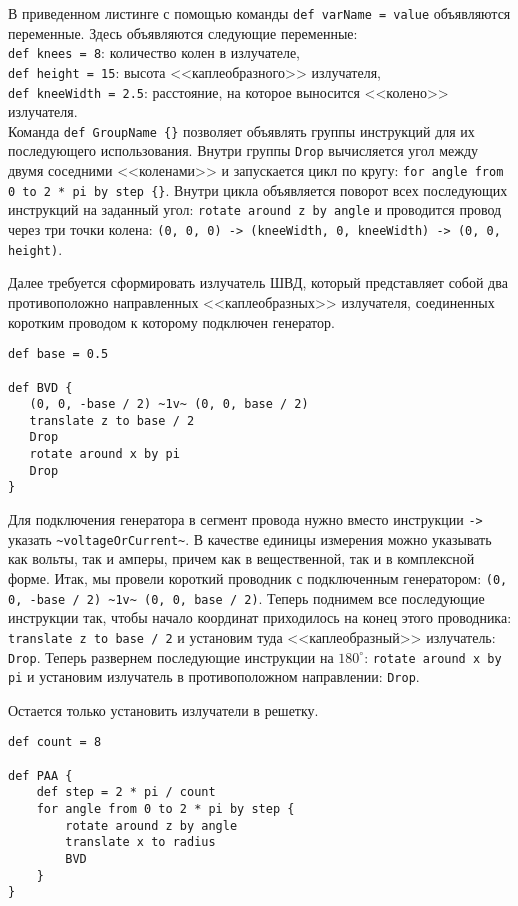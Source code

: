 В приведенном листинге с помощью команды \lstinline$def varName = value$ объявляются переменные. Здесь объявляются следующие переменные:\\
\lstinline$def knees = 8$: количество колен в излучателе, \\ \lstinline$def height = 15$: высота <<каплеобразного>> излучателя, \\ \lstinline$def kneeWidth = 2.5$: расстояние, на которое выносится <<колено>> излучателя. \\
Команда \lstinline$def GroupName {}$ позволяет объявлять группы инструкций для их последующего использования.
Внутри группы \lstinline$Drop$ вычисляется угол между двумя соседними <<коленами>> и запускается цикл по кругу: \lstinline$for angle from 0 to 2 * pi by step {}$. Внутри цикла объявляется поворот всех последующих инструкций на заданный угол: \lstinline$rotate around z by angle$ и проводится провод через три точки колена: \lstinline$(0, 0, 0) -> (kneeWidth, 0, kneeWidth) -> (0, 0, height)$.

Далее требуется сформировать излучатель ШВД, который представляет собой два противоположно направленных <<каплеобразных>> излучателя, соединенных коротким проводом к которому подключен генератор.

\begin{lstlisting}
def base = 0.5

def BVD {
   (0, 0, -base / 2) ~1v~ (0, 0, base / 2)
   translate z to base / 2
   Drop
   rotate around x by pi
   Drop
}

\end{lstlisting}   

Для подключения генератора в сегмент провода нужно вместо инструкции \lstinline$->$ указать \lstinline$~voltageOrCurrent~$. В качестве единицы измерения можно указывать как вольты, так и амперы, причем как в вещественной, так и в комплексной форме.
Итак, мы провели короткий проводник с подключенным генератором: \lstinline$(0, 0, -base / 2) ~1v~ (0, 0, base / 2)$. Теперь поднимем все последующие инструкции так, чтобы начало координат приходилось на конец этого проводника: \lstinline$translate z to base / 2$ и установим туда <<каплеобразный>> излучатель: \lstinline$Drop$. Теперь развернем последующие инструкции на $180^{\circ}$: \lstinline$rotate around x by pi$ и установим излучатель в противоположном направлении: \lstinline$Drop$.

Остается только установить излучатели в решетку.

\begin{lstlisting}
def count = 8

def PAA {
    def step = 2 * pi / count
    for angle from 0 to 2 * pi by step {
        rotate around z by angle
        translate x to radius
        BVD
    }
}

\end{lstlisting} 

